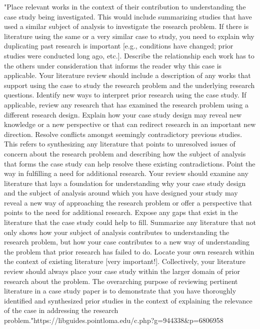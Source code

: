 "Place relevant works in the context of their contribution to understanding the case study being investigated. This would include summarizing studies that have used a similar subject of analysis to investigate the research problem. If there is literature using the same or a very similar case to study, you need to explain why duplicating past research is important [e.g., conditions have changed; prior studies were conducted long ago, etc.].
Describe the relationship each work has to the others under consideration that informs the reader why this case is applicable. Your literature review should include a description of any works that support using the case to study the research problem and the underlying research questions.
Identify new ways to interpret prior research using the case study. If applicable, review any research that has examined the research problem using a different research design. Explain how your case study design may reveal new knowledge or a new perspective or that can redirect research in an important new direction.
Resolve conflicts amongst seemingly contradictory previous studies. This refers to synthesizing any literature that points to unresolved issues of concern about the research problem and describing how the subject of analysis that forms the case study can help resolve these existing contradictions.
Point the way in fulfilling a need for additional research. Your review should examine any literature that lays a foundation for understanding why your case study design and the subject of analysis around which you have designed your study may reveal a new way of approaching the research problem or offer a perspective that points to the need for additional research.
Expose any gaps that exist in the literature that the case study could help to fill. Summarize any literature that not only shows how your subject of analysis contributes to understanding the research problem, but how your case contributes to a new way of understanding the problem that prior research has failed to do.
Locate your own research within the context of existing literature [very important!]. Collectively, your literature review should always place your case study within the larger domain of prior research about the problem. The overarching purpose of reviewing pertinent literature in a case study paper is to demonstrate that you have thoroughly identified and synthesized prior studies in the context of explaining the relevance of the case in addressing the research problem."https://libguides.pointloma.edu/c.php?g=944338&p=6806958

